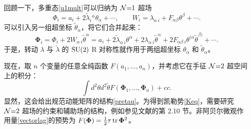 回顾一下，多重态\eqref{u1mult}可以归纳为 $\mathcal{N}{=}1$ 超场
\begin{equation}
\Phi_i=a_i+2\tilde\lambda _i{}^\alpha \theta_\alpha+\cdots,\qquad
W_i=\lambda_{\alpha\ i} +F_{\alpha\beta}\theta^\beta+\cdots.
\end{equation}
可以引入另一组超坐标 $\tilde\theta_\alpha$，将它们合并起来：
\begin{equation}
\mathbf{\Phi}_i=\Phi_i+2W_{\alpha\ i} \tilde\theta^\alpha
=a_i + 2\tilde\lambda_{\alpha\ i} \theta^\alpha + 2\lambda_{\alpha\ i}\tilde \theta^\alpha +2 F_{\alpha\beta\ i}\theta^{(\alpha} \tilde\theta^{\beta)}+\cdots.
\end{equation}
于是，转动 $\lambda$ 与 $\tilde\lambda$ 的 $\mathop{\mathrm{SU}}(2)$ R 对称性就作用于两组超坐标 $\theta_\alpha$ 和 $\tilde\theta_\alpha$。

现在，取 $n$ 个变量的任意全纯函数 $F(a_1,\ldots,a_n)$，并考虑它在手征 $\mathcal{N}{=}2$ 超空间上的积分：
\begin{equation}
\int d^2\theta d^2\tilde \theta F(\mathbf{\Phi}_1,\ldots,\mathbf{\Phi}_n) + cc.
\end{equation}
显然，这会给出规范动能矩阵的结构\eqref{pretau}。为得到凯勒势\eqref{Keq}，需要研究 $\mathcal{N}{=}2$ 超场的约束和辅助场的结构，例如参见文献\cite{D'Hoker:1999ft}的第 2.10 节。非阿贝尔微观作用量\eqref{vectorlag}的预势为 $F(\mathbf{\Phi})=\frac12\tau\mathop{\mathrm{tr}}\nolimits\mathbf{\Phi}^2$。
